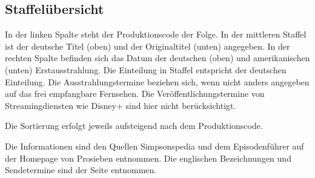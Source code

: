 \begin{appendix}
\section{Staffelübersicht}\label{StaffelUebersicht}
In der linken Spalte steht der Produktionscode der Folge. In der mittleren Staffel ist der deutsche Titel (oben) und der Originaltitel (unten) angegeben. In der rechten Spalte befinden sich das Datum der deutschen (oben) und amerikanischen (unten) Erstausstrahlung. Die Einteilung in Staffel entspricht der deutschen Einteilung. Die Ausstrahlungstermine beziehen sich, wenn nicht anders angegeben auf das frei empfangbare Fernsehen. Die Veröffentlichungstermine von Streamingdiensten wie Disney+ sind hier nicht berücksichtigt.

Die Sortierung erfolgt jeweils aufsteigend nach dem Produktionscode.

Die Informationen sind den Quellen Simpsonspedia \cite{Simpsonspedia} und dem Episodenführer auf der Homepage von Prosieben \cite{PRO7St01} entnommen. Die englischen Bezeichnungen und Sendetermine sind der Seite \cite{OffizielleHomepage} entnommen.


\end{appendix}
